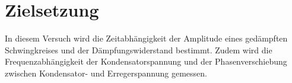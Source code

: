 \section{Zielsetzung}
\label{sec:Zielsetzung}

In diesem Versuch wird die Zeitabhängigkeit der Amplitude eines gedämpften Schwingkreises und
der Dämpfungswiderstand bestimmt. Zudem wird die Frequenzabhängigkeit
der Kondensatorspannung und der Phasenverschiebung zwischen Kondensator- und Erregerspannung gemessen.